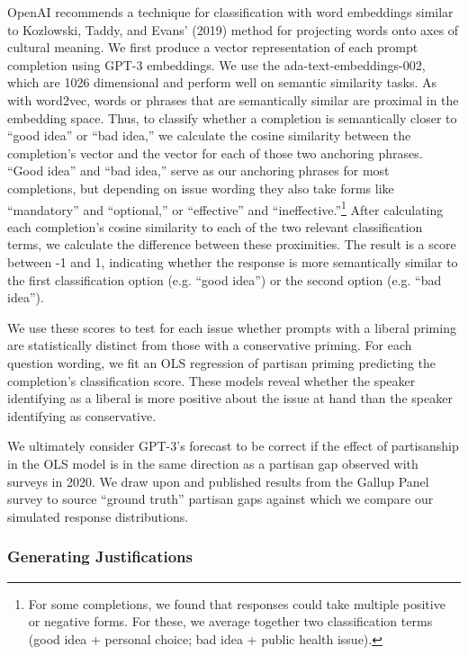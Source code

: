 \documentclass{article}
\begin{document}
OpenAI recommends a technique for classification with word embeddings
similar to Kozlowski, Taddy, and Evans' (2019) method for projecting
words onto axes of cultural meaning. We first produce a vector
representation of each prompt completion using GPT-3 embeddings. We use
the ada-text-embeddings-002, which are 1026 dimensional and perform well
on semantic similarity tasks. As with word2vec, words or phrases that
are semantically similar are proximal in the embedding space. Thus, to
classify whether a completion is semantically closer to ``good idea'' or
``bad idea,'' we calculate the cosine similarity between the
completion's vector and the vector for each of those two anchoring
phrases. ``Good idea'' and ``bad idea,'' serve as our anchoring phrases
for most completions, but depending on issue wording they also take
forms like ``mandatory'' and ``optional,'' or ``effective'' and
``ineffective.''\footnote{For some completions, we found that responses
  could take multiple positive or negative forms. For these, we average
  together two classification terms (good idea + personal choice; bad
  idea + public health issue).} After calculating each completion's
cosine similarity to each of the two relevant classification terms, we
calculate the difference between these proximities. The result is a
score between -1 and 1, indicating whether the response is more
semantically similar to the first classification option (e.g. ``good
idea'') or the second option (e.g. ``bad idea'').

We use these scores to test for each issue whether prompts with a
liberal priming are statistically distinct from those with a
conservative priming. For each question wording, we fit an OLS
regression of partisan priming predicting the completion's
classification score. These models reveal whether the speaker
identifying as a liberal is more positive about the issue at hand than
the speaker identifying as conservative.

We ultimately consider GPT-3's forecast to be correct if the effect of
partisanship in the OLS model is in the same direction as a partisan gap
observed with surveys in 2020. We draw upon \citet{Gadarian2021-su} and
published results from the Gallup Panel survey
\parencite{McCarthy2023-xj} to source
``ground truth'' partisan gaps against which we compare our simulated
response distributions.

\subsubsection*{Generating Justifications}
\end{document}
